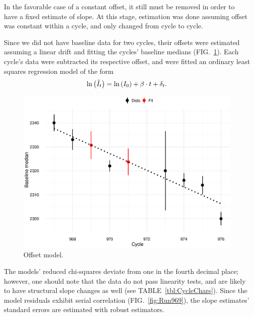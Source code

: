 \documentclass[reprint]{revtex4-1}
\newcommand{\scl}{.39}
\begin{document}
In the favorable case of a constant offset, it still must be removed in order to have a fixed estimate of slope. At this stage, estimation was done assuming offset was constant within a cycle, and only changed from cycle to cycle.

Since we did not have baseline data for two cycles, their offsets were estimated assuming a linear drift and fitting the cycles' baseline medians (FIG.~\ref{fig:OffsetModel}). Each cycle's data were subtracted its respective offset, and were fitted an ordinary least squares regression model of the form
\begin{equation}
	\ln\bkt{\tilde{I}_t} = \ln\bkt{I_0} + \slp\cdot t + \delta_t.
\end{equation}

\begin{figure}[h]
\includegraphics[scale=\scl]{img/Offset_model_Common_GAM.eps}
\caption{Offset model.\label{fig:OffsetModel}}
\end{figure}

The models' reduced chi-squares deviate from one in the fourth decimal place; however, one should note that the data do not pass linearity tests, and are likely to have structural slope changes as well (see TABLE~\ref{tbl:CycleChars}). Since the model residuals exhibit serial correlation (FIG.~\ref{fig:Run969}), the slope estimates' standard errors are estimated with robust estimators.
\end{document}
